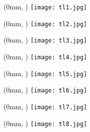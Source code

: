\begin{textblock*}{\paperwidth}(0mm, \dimexpr\paperheight-75mm\relax) %
  \noindent\texttt{[image: tl1.jpg]}
\end{textblock*}
\begin{textblock*}{\paperwidth}(0mm, \dimexpr\paperheight-75mm\relax) %
  \noindent\texttt{[image: tl2.jpg]}
\end{textblock*}
\begin{textblock*}{\paperwidth}(0mm, \dimexpr\paperheight-75mm\relax) %
  \noindent\texttt{[image: tl3.jpg]}
\end{textblock*}
\begin{textblock*}{\paperwidth}(0mm, \dimexpr\paperheight-75mm\relax) %
  \noindent\texttt{[image: tl4.jpg]}
\end{textblock*}
\begin{textblock*}{\paperwidth}(0mm, \dimexpr\paperheight-75mm\relax) %
  \noindent\texttt{[image: tl5.jpg]}
\end{textblock*}
\begin{textblock*}{\paperwidth}(0mm, \dimexpr\paperheight-75mm\relax) %
  \noindent\texttt{[image: tl6.jpg]}
\end{textblock*}
\begin{textblock*}{\paperwidth}(0mm, \dimexpr\paperheight-75mm\relax) %
  \noindent\texttt{[image: tl7.jpg]}
\end{textblock*}
\begin{textblock*}{\paperwidth}(0mm, \dimexpr\paperheight-75mm\relax) %
  \noindent\texttt{[image: tl8.jpg]}
\end{textblock*}